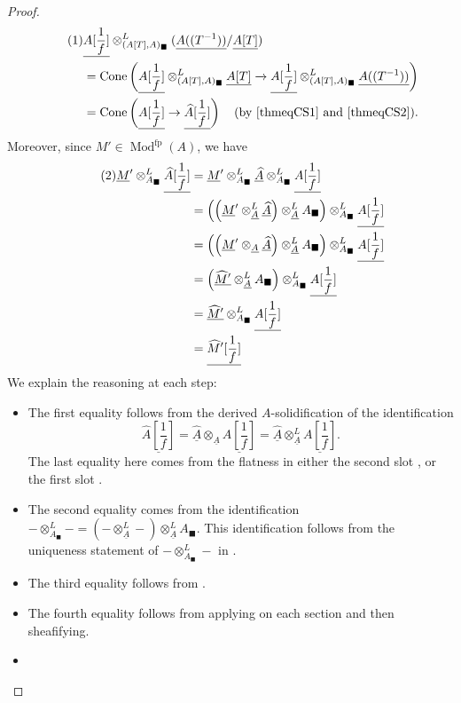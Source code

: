 \documentclass[11pt]{amsart}
\newcommand\numberthis{\addtocounter{equation}{1}\tag{\theequation}}
\newcommand{\ra}{\rightarrow} %
\newcommand{\xra}{\xrightarrow}
\newcommand{\Mod}{\operatorname{Mod}}
\newcommand{\bbox}{{\blacksquare}}
\newcommand{\fp}{\operatorname{{fp}}}
\renewcommand{\hat}{\widehat} %
\newcommand{\ul}{\underline}
\theoremstyle{plain}
\theoremstyle{definition}
\numberwithin{equation}{prop}
\begin{document}
\begin{proof}
\begin{align*}
\numberthis \label{thmeqCS3}
&\ul{A[\frac{1}{f}]}\otimes^L_{(A[T],A)_\bbox} (\ul{A((T^{-1}))}/\ul{A[T]})
\\
&={\rm Cone}\left(
\ul{A[\frac{1}{f}]}\otimes^L_{(A[T],A)_\bbox} \ul{A[T]}
\xra{}
\ul{A[\frac{1}{f}]}\otimes^L_{(A[T],A)_\bbox} \ul{A((T^{-1}))}
\right)
\\
&
={\rm Cone}\left( \ul{A[\frac{1}{f}]}\ra \ul{\hat A[\frac{1}{f}]}\right)
\quad\text{(by \eqref{thmeqCS1} and \eqref{thmeqCS2})}.
\end{align*}
Moreover, since $M'\in \Mod^{\fp}(A)$, we have
\begin{align*} 
\numberthis \label{thmeqCS4}
\ul M'\otimes^L_{A_\bbox} \ul{\hat A[\frac{1}{f}]}
&=\ul M'\otimes^L_{A_\bbox} \ul{\hat A} \otimes^L_{A_\bbox}\ul{A[\frac{1}{f}]}
\\
&=\left(\left(\ul M'\otimes^L_{\ul A} \ul{\hat A} \right)\otimes^L_{\ul A} A_\bbox\right)
\otimes^L_{A_\bbox}\ul{A[\frac{1}{f}]}
\\
&=\left(\left(\ul M'\otimes_{\ul A} \ul{\hat A} \right)\otimes^L_{\ul A} A_\bbox\right)
\otimes^L_{A_\bbox}\ul{A[\frac{1}{f}]}
\\&=
\left(\ul{\hat M'} \otimes^L_{\ul A} A_\bbox\right)
\otimes^L_{A_\bbox}\ul{A[\frac{1}{f}]}
\\&=
\ul{\hat M'}
\otimes^L_{A_\bbox}\ul{A[\frac{1}{f}]}
\\&=
\ul{\hat M'[\frac{1}{f}]}
\end{align*}
We explain the reasoning at each step:
\begin{itemize}
\item 
The first equality follows from the derived $A$-solidification of the identification
$$\ul{\hat A[\frac{1}{f}]}
=\ul{\hat A}\otimes_{\ul A}\ul{ A[\frac{1}{f}]}
= \ul{\hat A}\otimes^L_{\ul A}\ul{ A[\frac{1}{f}]}.$$
The last equality here comes from the flatness in either the second slot , or the first slot .
\item 
The second equality comes from the identification $-\otimes^L_{A_\bbox}-=(-\otimes^L_{\ul A}-)\otimes^L_{\ul A} A_\bbox$.
This identification follows from the uniqueness statement of $-\otimes^L_{A_\bbox}-$ in \cite[Theorem 7.5(ii)]{CS}.
\item 
The third equality follows from .
\item 
The fourth equality follows from applying \cite[Theorem 8.7]{Matsumura} on each section and then sheafifying.
\item 

\end{itemize}
\end{proof}
\end{document}
